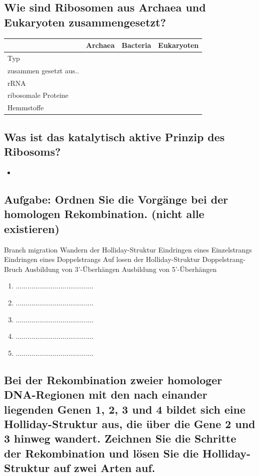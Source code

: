 \documentclass{article}
\begin{document}
\subsection*{Wie sind Ribosomen aus Archaea und Eukaryoten zusammengesetzt?} 
\begin{table}[H]
    \centering
    \begin{tabular}{ |p{2cm}|| p{4cm}| p{4cm}| p{4cm}|}
    \hline
     & Archaea & Bacteria & Eukaryoten \\ \hline \hline
    Typ &   &  & \\ \hline
    zusammen gesetzt aus..  &   &  & \\ \hline
    rRNA &  &   &  & \\ \hline
    ribosomale Proteine  &   &  & \\ \hline
    Hemmstoffe &   &  & \\ \hline
\end{tabular}
\end{table}

\subsection*{Was ist das katalytisch aktive Prinzip des Ribosoms?}
\begin{itemize}     \item  \end{itemize} \bigskip

\subsection*{Aufgabe: Ordnen Sie die Vorgänge bei der homologen Rekombination. (nicht alle existieren)}
Branch migration Wandern der Holliday-Struktur Eindringen eines Einzelstrangs
Eindringen eines Doppelstrangs Auf losen der Holliday-Struktur Doppelstrang-Bruch
Ausbildung von 3'-Überhängen Ausbildung von 5'-Überhängen
\begin{enumerate}
    \item ........................................
    \item ........................................
    \item........................................
    \item ........................................
    \item ........................................
\end{enumerate}


\subsection*{Bei der Rekombination zweier homologer DNA-Regionen mit den nach einander liegenden Genen 1, 2, 3 und 4 bildet sich eine Holliday-Struktur aus, die über die Gene 2 und 3 hinweg wandert. Zeichnen Sie die Schritte der Rekombination und lösen Sie die Holliday-Struktur auf zwei Arten auf.} 
\newpage
\end{document}
